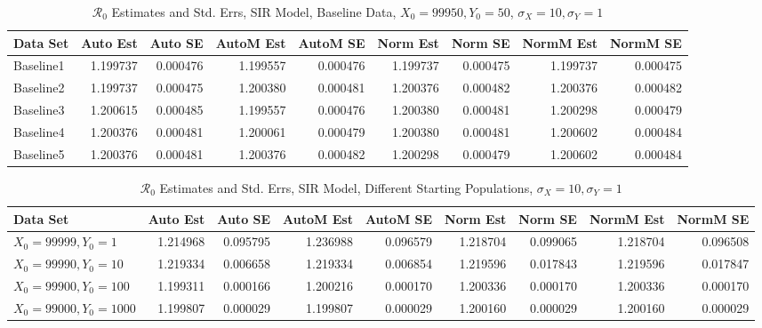 \documentclass[12pt]{article}
\newcommand{\rr}{\ensuremath{\mathcal{R}_0}}
\begin{document}
\begin{table}[H]
	\caption{$\rr$ Estimates and Std. Errs, SIR Model, 
		Baseline Data, $X_0 = 99950, Y_0 = 50$, 
		$\sigma_X = 10, \sigma_Y = 1$}
	\begin{footnotesize}
		\hskip -1cm
		\begin{tabular}{l|r|r|r|r|r|r|r|r}
			\hline
			Data Set & Auto Est & Auto SE & AutoM Est & AutoM SE & Norm Est & Norm SE & NormM Est & NormM SE\\
			\hline
			Baseline1 & 1.199737 & 0.000476 & 1.199557 & 0.000476 & 1.199737 & 0.000475 & 1.199737 & 0.000475\\
			\hline
			Baseline2 & 1.199737 & 0.000475 & 1.200380 & 0.000481 & 1.200376 & 0.000482 & 1.200376 & 0.000482\\
			\hline
			Baseline3 & 1.200615 & 0.000485 & 1.199557 & 0.000476 & 1.200380 & 0.000481 & 1.200298 & 0.000479\\
			\hline
			Baseline4 & 1.200376 & 0.000481 & 1.200061 & 0.000479 & 1.200380 & 0.000481 & 1.200602 & 0.000484\\
			\hline
			Baseline5 & 1.200376 & 0.000481 & 1.200376 & 0.000482 & 1.200298 & 0.000479 & 1.200602 & 0.000484\\
			\hline
		\end{tabular}
	\end{footnotesize}
\end{table}


\begin{table}[H]
	
	\caption{$\rr$ Estimates and Std. Errs, SIR Model,
		Different Starting Populations, 
		$\sigma_X = 10, \sigma_Y = 1$}
	\begin{footnotesize}
		\hskip -1.7cm
		\begin{tabular}{l|r|r|r|r|r|r|r|r}
			\hline
			Data Set & Auto Est & Auto SE & AutoM Est & AutoM SE & Norm Est & Norm SE & NormM Est & NormM SE\\
			\hline
			$X_0 = 99999, Y_0 = 1$ & 1.214968 & 0.095795 & 1.236988 & 0.096579 & 1.218704 & 0.099065 & 1.218704 & 0.096508\\
			\hline
			$X_0 = 99990, Y_0 = 10$ & 1.219334 & 0.006658 & 1.219334 & 0.006854 & 1.219596 & 0.017843 & 1.219596 & 0.017847\\
			\hline
			$X_0 = 99900, Y_0 = 100$ & 1.199311 & 0.000166 & 1.200216 & 0.000170 & 1.200336 & 0.000170 & 1.200336 & 0.000170\\
			\hline
			$X_0 = 99000, Y_0 = 1000$ & 1.199807 & 0.000029 & 1.199807 & 0.000029 & 1.200160 & 0.000029 & 1.200160 & 0.000029\\
			\hline
		\end{tabular}
	\end{footnotesize}
\end{table}
\end{document}
